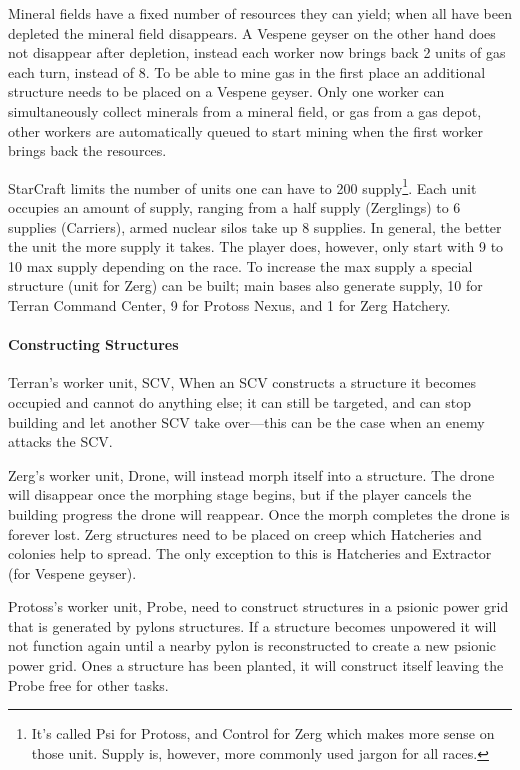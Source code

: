 Mineral fields have a fixed number of resources they can yield; when all have been depleted the mineral field disappears. A Vespene geyser on the other hand does not disappear after depletion, instead each worker now brings back 2 units of gas each turn, instead of 8. To be able to mine gas in the first place an additional structure needs to be placed on a Vespene geyser. Only one worker can simultaneously collect minerals from a mineral field, or gas from a gas depot, other workers are automatically queued to start mining when the first worker brings back the resources.

StarCraft limits the number of units one can have to 200 supply\footnote{It’s called Psi for Protoss, and Control for Zerg which makes more sense on those unit. Supply is, however, more commonly used jargon for all races.}. Each unit occupies an amount of supply, ranging from a half supply (Zerglings) to 6 supplies (Carriers), armed nuclear silos take up 8 supplies. In general, the better the unit the more supply it takes. The player does, however, only start with 9 to 10 max supply depending on the race. To increase the max supply a special structure (unit for Zerg) can be built; main bases also generate supply, 10 for Terran Command Center, 9 for Protoss Nexus, and 1 for Zerg Hatchery.

\paragraph{Constructing Structures}
Terran's worker unit, SCV,  When an SCV constructs a structure it becomes occupied and cannot do anything else; it can still be targeted, and can stop building and let another SCV take over—this can be the case when an enemy attacks the SCV.

Zerg’s worker unit, Drone, will instead morph itself into a structure. The drone will disappear once the morphing stage begins, but if the player cancels the building progress the drone will reappear. Once the morph completes the drone is forever lost. Zerg structures need to be placed on creep which Hatcheries and colonies help to spread. The only exception to this is Hatcheries and Extractor (for Vespene geyser).

Protoss’s worker unit, Probe, need to construct structures in a psionic power grid that is generated by pylons structures. If a structure becomes unpowered it will not function again until a nearby pylon is reconstructed to create a new psionic power grid. Ones a structure has been planted, it will construct itself leaving the Probe free for other tasks.

